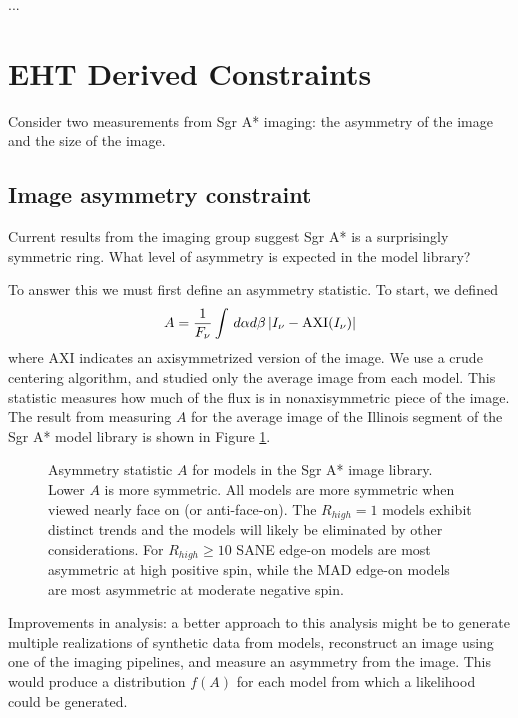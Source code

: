 \documentclass[twocolumn,tighten,dvipsnames]{aastex63}
\newcommand\<{{\langle}}
\renewcommand\>{{\rangle}} %
\begin{document}
...

\section{EHT Derived Constraints}

Consider two measurements from Sgr A* imaging: the asymmetry of the image and the size of the image.

\subsection{Image asymmetry constraint}

Current results from the imaging group suggest Sgr A* is a surprisingly symmetric ring.   What level of asymmetry is expected in the model library?

To answer this we must first define an asymmetry statistic.  To start, we defined
\begin{equation}
    A = \frac{1}{F_\nu} \int \, d\alpha d\beta \, | I_\nu - {\rm AXI}(I_\nu) |
\end{equation}
where AXI indicates an axisymmetrized version of the image.  We use a crude centering algorithm, and studied only the average image from each model.  This statistic measures how much of the flux is in nonaxisymmetric piece of the image.   The result from measuring $A$ for the average image of the Illinois segment of the Sgr A* model library is shown in Figure \ref{fig:asymm}.

\begin{figure}\label{fig:asymm}
    \caption{Asymmetry statistic $A$ for models in the Sgr A* image library.  Lower $A$ is more symmetric.  All models are more symmetric when viewed nearly face on (or anti-face-on).  The $R_{high} = 1$ models exhibit distinct trends and the models will likely be eliminated by other considerations.  For $R_{high} \ge 10$ SANE edge-on models are most asymmetric at high positive spin, while the MAD edge-on models are most asymmetric at moderate negative spin.}
\end{figure}

Improvements in analysis: a better approach to this analysis might be to generate multiple realizations of synthetic data from models, reconstruct an image using one of the imaging pipelines, and measure an asymmetry from the image.  This would produce a distribution $f(A)$ for each model from which a likelihood could be generated.
\end{document}
